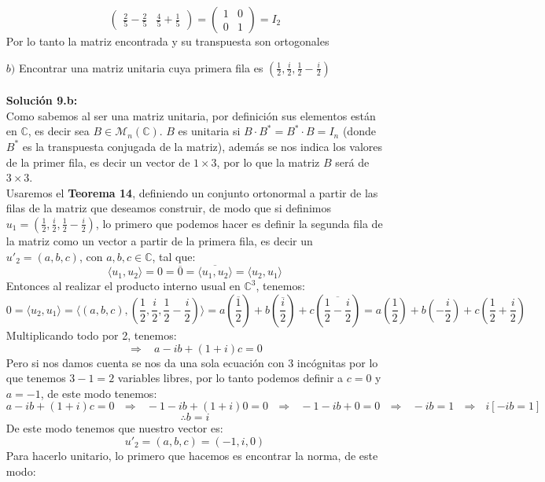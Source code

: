 \begin{itemize}
\[\begin{pmatrix}
    \frac{2}{5}-\frac{2}{5} & \frac{4}{5}+\frac{1}{5}\end{pmatrix}=\begin{pmatrix}
    1 & 0\\
    0 & 1\end{pmatrix}=I_2\]
    Por lo tanto la matriz encontrada y su transpuesta son ortogonales
    \item [$b)$] Encontrar una matriz unitaria cuya primera fila es $\displaystyle  \left(\frac{1}{2},\frac{i}{2},\frac{1}{2}-\frac{i}{2}\right)$\\\\
    \textbf{Soluci\'on 9.b:}\\
    Como sabemos al ser una matriz unitaria, por definici\'on sus elementos est\'an en $\mathbb{C}$, es decir sea $B\in\mathcal{M}_n(\mathbb{C})$. $B$ es unitaria si $B\cdot B^*=B^*\cdot B=I_n$ (donde $B^*$ es la transpuesta conjugada de la matriz), adem\'as se nos indica los valores de la primer fila, es decir un vector de $1\times 3$, por lo que la matriz $B$ ser\'a de $3\times 3$.\\
    Usaremos el \textbf{Teorema 14}, definiendo un conjunto ortonormal a partir de las filas de la matriz que deseamos construir, de modo que si definimos $u_1 = \left(\frac{1}{2},\frac{i}{2},\frac{1}{2}-\frac{i}{2}\right) $, lo primero que podemos hacer es definir la segunda fila de la matriz como un vector a partir de la primera fila, es decir un $u'_2=(a,b,c)$, con $a,b,c\in\mathbb{C}$, tal que:
    \[\langle u_1,u_2\rangle=0=\overline{0}=\overline{\langle u_1,u_2\rangle}=\langle u_2,u_1\rangle\]
    Entonces al realizar el producto interno usual en $\mathbb{C}^3$, tenemos:
    \[0=\langle u_2,u_1\rangle=\langle (a,b,c),\left(\frac{1}{2},\frac{i}{2},\frac{1}{2}-\frac{i}{2}\right)\rangle=a\left(\overline{\frac{1}{2}}\right)+b\left(\overline{\frac{i}{2}}\right)+c\left(\overline{\frac{1}{2}-\frac{i}{2}}\right)=a\left(\frac{1}{2}\right)+b\left(-\frac{i}{2}\right)+c\left(\frac{1}{2}+\frac{i}{2}\right)\]
    Multiplicando todo por 2, tenemos:
    \[\Longrightarrow~~~~ a-ib+(1+i)c=0\]
    Pero si nos damos cuenta se nos da una sola ecuaci\'on con 3 inc\'ognitas por lo que tenemos $3-1=2$ variables libres, por lo tanto podemos definir a $c=0$ y $a=-1$, de este modo tenemos:
    \[a-ib+(1+i)c=0~~~\Longrightarrow~~~-1-ib+(1+i)0=0~~~\Longrightarrow~~~-1-ib+0=0~~~\Longrightarrow~~~-ib=1~~~\Longrightarrow~~~i[-ib=1]\]
    \[\therefore b=i\]
    De este modo tenemos que nuestro vector es:
    \[u'_2=(a,b,c)=(-1,i,0)\]
    Para hacerlo unitario, lo primero que hacemos es encontrar la norma, de este modo:

\end{itemize}
